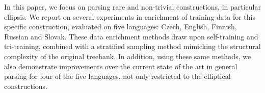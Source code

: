 In this paper, we focus on parsing rare and non-trivial constructions, in particular ellipsis. We report on several experiments in enrichment of training data for this specific construction, evaluated on five languages: Czech, English, Finnish, Russian and Slovak. These data enrichment methods draw upon self-training and tri-training, combined with a stratified sampling method mimicking the structural complexity of the original treebank. In addition, using these same methods, we also demonstrate improvements over the current state of the art in general parsing for four of the five languages, not only restricted to the elliptical constructions.
